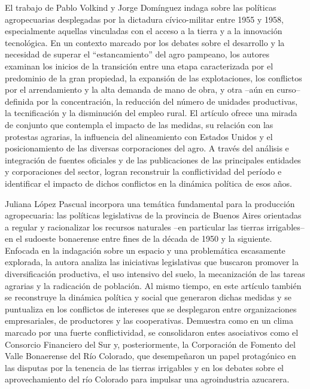 \documentclass{article}
\begin{document}
El trabajo de Pablo Volkind y Jorge Domínguez indaga sobre las políticas agropecuarias desplegadas por la dictadura cívico-militar entre 1955 y 1958, especialmente aquellas vinculadas con el acceso a la tierra y a la innovación tecnológica. En un contexto marcado por los debates sobre el desarrollo y la necesidad de superar el “estancamiento” del agro pampeano, los autores examinan los inicios de la transición entre una etapa caracterizada por el predominio de la gran propiedad, la expansión de las explotaciones, los conflictos por el arrendamiento y la alta demanda de mano de obra, y otra –aún en curso– definida por la concentración, la reducción del número de unidades productivas, la tecnificación y la disminución del empleo rural. El artículo ofrece una mirada de conjunto que contempla el impacto de las medidas, su relación con las protestas agrarias, la influencia del alineamiento con Estados Unidos y el posicionamiento de las diversas corporaciones del agro. A través del análisis e integración de fuentes oficiales y de las publicaciones de las principales entidades y corporaciones del sector, logran reconstruir la conflictividad del período e identificar el impacto de dichos conflictos en la dinámica política de esos años.

Juliana López Pascual incorpora una temática fundamental para la producción agropecuaria: las políticas legislativas de la provincia de Buenos Aires orientadas a regular y racionalizar los recursos naturales –en particular las tierras irrigables– en el sudoeste bonaerense entre fines de la década de 1950 y la siguiente. Enfocada en la indagación sobre un espacio y una problemática escasamente explorada, la autora analiza las iniciativas legislativas que buscaron promover la diversificación productiva, el uso intensivo del suelo, la mecanización de las tareas agrarias y la radicación de población. Al mismo tiempo, en este artículo también se reconstruye la dinámica política y social que generaron dichas medidas y se puntualiza en los conflictos de intereses que se desplegaron entre organizaciones empresariales, de productores y las cooperativas. Demuestra como en un clima marcado por una fuerte conflictividad, se consolidaron entes asociativos como el Consorcio Financiero del Sur y, posteriormente, la Corporación de Fomento del Valle Bonaerense del Río Colorado, que desempeñaron un papel protagónico en las disputas por la tenencia de las tierras irrigables y en los debates sobre el aprovechamiento del río Colorado para impulsar una agroindustria azucarera.
\end{document}
